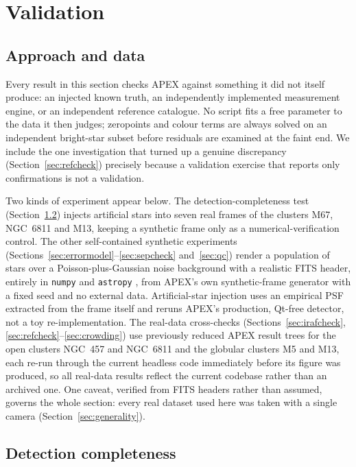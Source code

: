 \documentclass[fleqn,usenatbib]{mnras}
\begin{document}
\section{Validation}
\label{sec:validation}

\subsection{Approach and data}

Every result in this section checks APEX against something it did not itself produce: an injected known truth, an independently implemented measurement engine, or an independent reference catalogue. No script fits a free parameter to the data it then judges; zeropoints and colour terms are always solved on an independent bright-star subset before residuals are examined at the faint end. We include the one investigation that turned up a genuine discrepancy (Section~\ref{sec:refcheck}) precisely because a validation exercise that reports only confirmations is not a validation.

Two kinds of experiment appear below. The detection-completeness test (Section~\ref{sec:completeness}) injects artificial stars into seven real frames of the clusters M67, NGC~6811 and M13, keeping a synthetic frame only as a numerical-verification control. The other self-contained synthetic experiments (Sections~\ref{sec:errormodel}--\ref{sec:sepcheck} and~\ref{sec:qc}) render a population of stars over a Poisson-plus-Gaussian noise background with a realistic FITS header, entirely in \texttt{numpy} and \texttt{astropy} \citep{astropy2013, astropy2022}, from APEX's own synthetic-frame generator with a fixed seed and no external data. Artificial-star injection uses an empirical PSF extracted from the frame itself and reruns APEX's production, Qt-free detector, not a toy re-implementation. The real-data cross-checks (Sections~\ref{sec:irafcheck}, \ref{sec:refcheck}--\ref{sec:crowding}) use previously reduced APEX result trees for the open clusters NGC~457 and NGC~6811 and the globular clusters M5 and M13, each re-run through the current headless code immediately before its figure was produced, so all real-data results reflect the current codebase rather than an archived one. One caveat, verified from FITS headers rather than assumed, governs the whole section: every real dataset used here was taken with a single camera (Section~\ref{sec:generality}).

\subsection{Detection completeness}
\label{sec:completeness}
\end{document}
